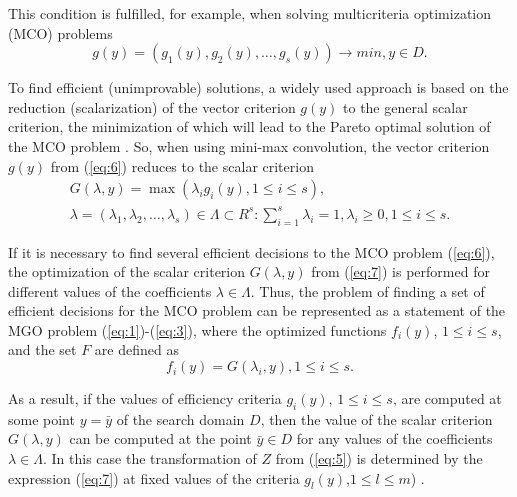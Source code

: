 \documentclass[review]{elsarticle}
\begin{document}
This condition is fulfilled, for example, when solving multicriteria optimization (MCO) problems 
\begin{equation}\label{eq:6}
g(y) = (g_1(y), g_2(y), \dots , g_s(y)) \to min,  y\in D.
\end{equation}

To find efficient (unimprovable) solutions, a widely used approach is based on the reduction (scalarization) of the vector criterion $g(y)$ to the general scalar criterion, the minimization of which will lead to the Pareto optimal solution of the MCO problem \cite{c29,c30,c31,c32,c33}. So, when using mini-max convolution, the vector criterion $g(y)$ from (\ref{eq:6}) reduces to the scalar criterion
\begin{equation}\label{eq:7}
\begin{matrix}
G(\lambda,y)=\max{(\lambda_i g_i(y),1 \leq i \leq s)},	\\
\lambda=(\lambda_1,\lambda_2,\dots,\lambda_s)\in \Lambda \subset R^s:\sum_{i=1}^s{\lambda_i =1},\lambda_i\geq 0,1 \leq i \leq s.
\end{matrix}
\end{equation}


If it is necessary to find several efficient decisions to the MCO problem (\ref{eq:6}), the optimization of the scalar criterion $G(\lambda,y)$ from (\ref{eq:7}) is performed for different values of the coefficients $\lambda \in \Lambda$. Thus, the problem of finding a set of efficient decisions for the MCO problem can be represented as a statement of the MGO problem (\ref{eq:1})-(\ref{eq:3}), where the optimized functions $f_i(y)$, $1 \leq i \leq s$, and the set $F$ are defined as
\begin{equation}\label{eq:8}
f_i (y)= G(\lambda_i,y),1 \leq i \leq s.
\end{equation}

As a result, if the values of efficiency criteria $g_i(y)$, $1 \leq i \leq s$, are computed at some point $y=\bar{y}$ of the search domain $D$, then the value of the scalar criterion $G(\lambda,y)$ can be computed at the point $\bar{y} \in D$ for any values of the coefficients $\lambda \in \Lambda$. In this case the transformation of $Z$ from (\ref{eq:5}) is determined by the expression (\ref{eq:7}) at fixed values of the criteria $g_l (y)$,$1 \leq l \leq m$) \cite{c27,c28}.
\end{document}
